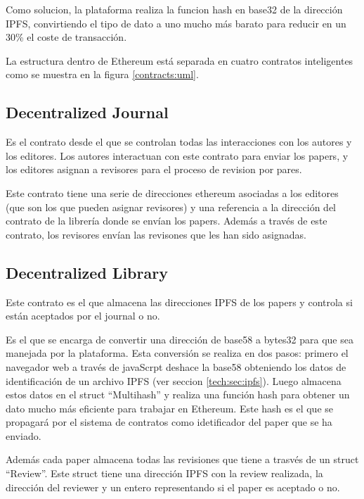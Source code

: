 Como solucion, la plataforma realiza la funcion hash en base32 de la dirección
IPFS, convirtiendo el tipo de dato a uno mucho más barato para reducir en un
30\% el coste de transacción.



La estructura dentro de Ethereum está separada en cuatro contratos inteligentes
como se muestra en la figura \ref{contracts:uml}.

\subsection*{Decentralized Journal} Es el contrato desde el que se controlan
todas las interacciones con los autores y los editores. Los autores interactuan
con este contrato para enviar los papers, y los editores asignan a revisores
para el proceso de revision por pares.

Este contrato tiene una serie de direcciones ethereum asociadas a los editores
(que son los que pueden asignar revisores) y una referencia a la dirección del
contrato de la librería donde se envían los papers. Además a través de este
contrato, los revisores envían las revisones que les han sido asignadas.

\subsection*{Decentralized Library} Este contrato es el que almacena las
direcciones IPFS de los papers y controla si están aceptados por el journal o
no.

Es el que se encarga de convertir una dirección de base58 a bytes32 para que sea
manejada por la plataforma. Esta conversión se realiza en dos pasos: primero el
navegador web a través de javaScrpt deshace la base58 obteniendo los datos de
identificación de un archivo IPFS (ver seccion \ref{tech:sec:ipfs}). Luego
almacena estos datos en el struct ``Multihash'' y realiza una función hash para
obtener un dato mucho más eficiente para trabajar en Ethereum. Este hash es el
que se propagará por el sistema de contratos como idetificador del paper que se
ha enviado.

Además cada paper almacena todas las revisiones que tiene a trasvés de un struct
``Review''. Este struct tiene una dirección IPFS con la review realizada, la
dirección del reviewer y un entero representando si el paper es aceptado o no.

